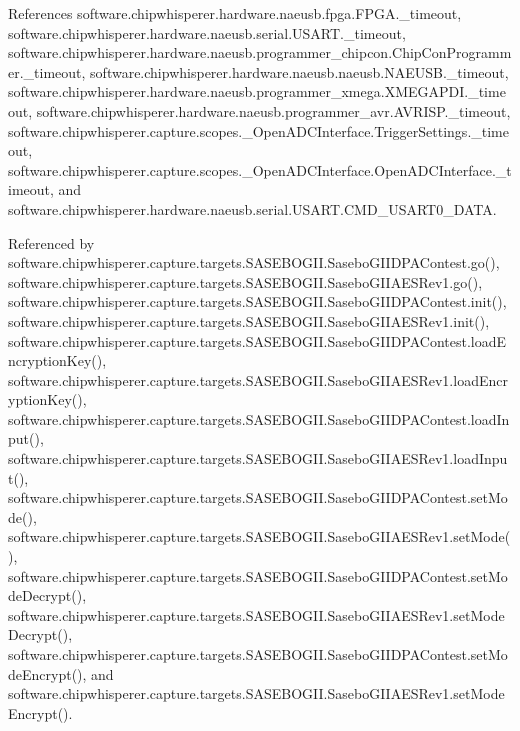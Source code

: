 References software.\+chipwhisperer.\+hardware.\+naeusb.\+fpga.\+F\+P\+G\+A.\+\_\+timeout, software.\+chipwhisperer.\+hardware.\+naeusb.\+serial.\+U\+S\+A\+R\+T.\+\_\+timeout, software.\+chipwhisperer.\+hardware.\+naeusb.\+programmer\+\_\+chipcon.\+Chip\+Con\+Programmer.\+\_\+timeout, software.\+chipwhisperer.\+hardware.\+naeusb.\+naeusb.\+N\+A\+E\+U\+S\+B.\+\_\+timeout, software.\+chipwhisperer.\+hardware.\+naeusb.\+programmer\+\_\+xmega.\+X\+M\+E\+G\+A\+P\+D\+I.\+\_\+timeout, software.\+chipwhisperer.\+hardware.\+naeusb.\+programmer\+\_\+avr.\+A\+V\+R\+I\+S\+P.\+\_\+timeout, software.\+chipwhisperer.\+capture.\+scopes.\+\_\+\+Open\+A\+D\+C\+Interface.\+Trigger\+Settings.\+\_\+timeout, software.\+chipwhisperer.\+capture.\+scopes.\+\_\+\+Open\+A\+D\+C\+Interface.\+Open\+A\+D\+C\+Interface.\+\_\+timeout, and software.\+chipwhisperer.\+hardware.\+naeusb.\+serial.\+U\+S\+A\+R\+T.\+C\+M\+D\+\_\+\+U\+S\+A\+R\+T0\+\_\+\+D\+A\+T\+A.



Referenced by software.\+chipwhisperer.\+capture.\+targets.\+S\+A\+S\+E\+B\+O\+G\+I\+I.\+Sasebo\+G\+I\+I\+D\+P\+A\+Contest.\+go(), software.\+chipwhisperer.\+capture.\+targets.\+S\+A\+S\+E\+B\+O\+G\+I\+I.\+Sasebo\+G\+I\+I\+A\+E\+S\+Rev1.\+go(), software.\+chipwhisperer.\+capture.\+targets.\+S\+A\+S\+E\+B\+O\+G\+I\+I.\+Sasebo\+G\+I\+I\+D\+P\+A\+Contest.\+init(), software.\+chipwhisperer.\+capture.\+targets.\+S\+A\+S\+E\+B\+O\+G\+I\+I.\+Sasebo\+G\+I\+I\+A\+E\+S\+Rev1.\+init(), software.\+chipwhisperer.\+capture.\+targets.\+S\+A\+S\+E\+B\+O\+G\+I\+I.\+Sasebo\+G\+I\+I\+D\+P\+A\+Contest.\+load\+Encryption\+Key(), software.\+chipwhisperer.\+capture.\+targets.\+S\+A\+S\+E\+B\+O\+G\+I\+I.\+Sasebo\+G\+I\+I\+A\+E\+S\+Rev1.\+load\+Encryption\+Key(), software.\+chipwhisperer.\+capture.\+targets.\+S\+A\+S\+E\+B\+O\+G\+I\+I.\+Sasebo\+G\+I\+I\+D\+P\+A\+Contest.\+load\+Input(), software.\+chipwhisperer.\+capture.\+targets.\+S\+A\+S\+E\+B\+O\+G\+I\+I.\+Sasebo\+G\+I\+I\+A\+E\+S\+Rev1.\+load\+Input(), software.\+chipwhisperer.\+capture.\+targets.\+S\+A\+S\+E\+B\+O\+G\+I\+I.\+Sasebo\+G\+I\+I\+D\+P\+A\+Contest.\+set\+Mode(), software.\+chipwhisperer.\+capture.\+targets.\+S\+A\+S\+E\+B\+O\+G\+I\+I.\+Sasebo\+G\+I\+I\+A\+E\+S\+Rev1.\+set\+Mode(), software.\+chipwhisperer.\+capture.\+targets.\+S\+A\+S\+E\+B\+O\+G\+I\+I.\+Sasebo\+G\+I\+I\+D\+P\+A\+Contest.\+set\+Mode\+Decrypt(), software.\+chipwhisperer.\+capture.\+targets.\+S\+A\+S\+E\+B\+O\+G\+I\+I.\+Sasebo\+G\+I\+I\+A\+E\+S\+Rev1.\+set\+Mode\+Decrypt(), software.\+chipwhisperer.\+capture.\+targets.\+S\+A\+S\+E\+B\+O\+G\+I\+I.\+Sasebo\+G\+I\+I\+D\+P\+A\+Contest.\+set\+Mode\+Encrypt(), and software.\+chipwhisperer.\+capture.\+targets.\+S\+A\+S\+E\+B\+O\+G\+I\+I.\+Sasebo\+G\+I\+I\+A\+E\+S\+Rev1.\+set\+Mode\+Encrypt().


